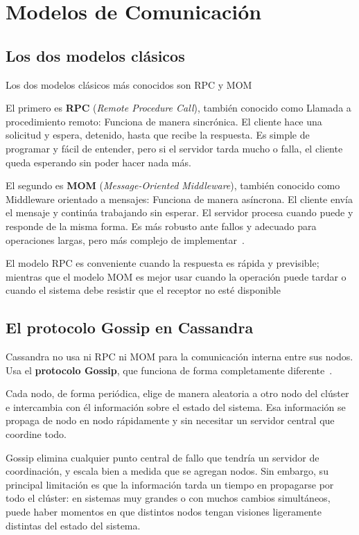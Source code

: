 \documentclass[12pt, a4paper]{article}
\begin{document}
\section{Modelos de Comunicación}
\subsection{Los dos modelos clásicos}

Los dos modelos clásicos más conocidos son RPC y MOM

El primero es \textbf{RPC} (\textit{Remote Procedure Call}), también conocido como Llamada a procedimiento remoto: Funciona de manera sincrónica. El cliente hace una solicitud y espera, detenido, hasta que recibe la respuesta. Es simple de programar y fácil de entender, pero si el servidor tarda mucho o falla, el cliente queda
esperando sin poder hacer nada más.

El segundo es \textbf{MOM} (\textit{Message-Oriented Middleware}), también conocido como Middleware orientado a mensajes:
Funciona de manera asíncrona. El cliente envía el mensaje y continúa trabajando sin esperar. El servidor procesa cuando puede y responde de la misma forma. Es más robusto ante fallos y adecuado para operaciones largas, pero más complejo de implementar~\cite{menasce2005}.

El modelo RPC es conveniente cuando la respuesta es rápida y previsible; mientras que el modelo MOM es mejor usar cuando la operación puede tardar o cuando el sistema debe
resistir que el receptor no esté disponible

\subsection{El protocolo Gossip en Cassandra}

Cassandra no usa ni RPC ni MOM para la comunicación interna entre sus
nodos. Usa el \textbf{protocolo Gossip}, que funciona de forma completamente diferente~\cite{lakshman2010}.

Cada nodo, de forma periódica, elige de manera aleatoria a otro nodo del clúster e intercambia con él información sobre el estado del sistema. Esa información se propaga de nodo en nodo rápidamente y sin necesitar un servidor central que coordine todo.

Gossip elimina cualquier punto central de fallo
que tendría un servidor de coordinación, y escala bien a medida que
se agregan nodos. Sin embargo, su principal limitación es que la
información tarda un tiempo en propagarse por todo el clúster: en
sistemas muy grandes o con muchos cambios simultáneos, puede haber
momentos en que distintos nodos tengan visiones ligeramente distintas
del estado del sistema.
\end{document}

